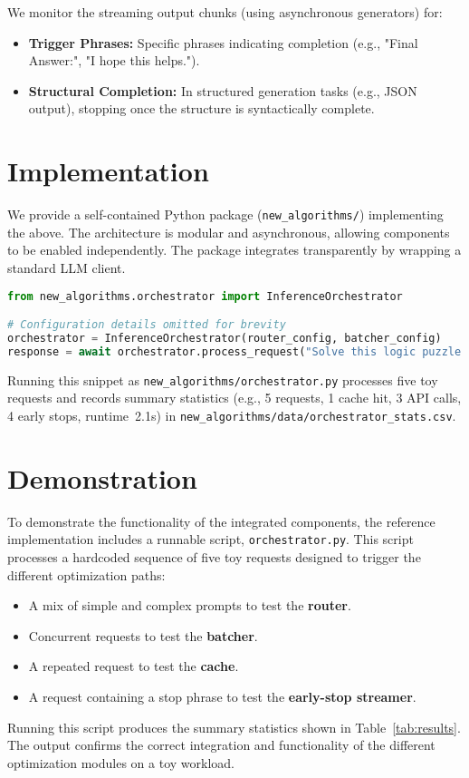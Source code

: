 \documentclass[11pt]{article}
\begin{document}
We monitor the streaming output chunks (using asynchronous generators) for:
\begin{itemize}
    \item \textbf{Trigger Phrases:} Specific phrases indicating completion (e.g., "Final Answer:", "I hope this helps.").
    \item \textbf{Structural Completion:} In structured generation tasks (e.g., JSON output), stopping once the structure is syntactically complete.
\end{itemize}

\section{Implementation}
We provide a self-contained Python package (\texttt{new\_algorithms/}) implementing the above. The architecture is modular and asynchronous, allowing components to be enabled independently. The package integrates transparently by wrapping a standard LLM client.

\begin{lstlisting}[language=Python, caption=Example usage of the integrated orchestrator]
from new_algorithms.orchestrator import InferenceOrchestrator

# Configuration details omitted for brevity
orchestrator = InferenceOrchestrator(router_config, batcher_config)
response = await orchestrator.process_request("Solve this logic puzzle...", params)
\end{lstlisting}

Running this snippet as \texttt{new\_algorithms/orchestrator.py} processes five toy requests and records summary statistics (e.g., 5 requests, 1 cache hit, 3 API calls, 4 early stops, runtime~\approx2.1s) in \texttt{new\_algorithms/data/orchestrator\_stats.csv}.

\section{Demonstration}
To demonstrate the functionality of the integrated components, the reference implementation includes a runnable script, \texttt{orchestrator.py}. This script processes a hardcoded sequence of five toy requests designed to trigger the different optimization paths:
\begin{itemize}
    \item A mix of simple and complex prompts to test the \textbf{router}.
    \item Concurrent requests to test the \textbf{batcher}.
    \item A repeated request to test the \textbf{cache}.
    \item A request containing a stop phrase to test the \textbf{early-stop streamer}.
\end{itemize}
Running this script produces the summary statistics shown in Table~\ref{tab:results}. The output confirms the correct integration and functionality of the different optimization modules on a toy workload.
\end{document}
